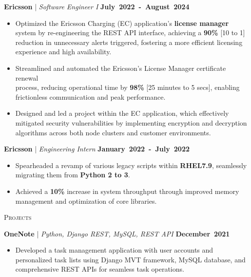 \documentclass[11pt, a4paper]{article}
\newcommand{\dates}[1]{\hfill\mbox{\textbf{#1}}} %
\newcommand{\headright}[1]{\vspace*{1.5ex}\textsc{\Large\color{heading}#1}\par%
     \vspace*{-1.5ex}{\color{accent}\hrulefill}\par}
\begin{document}
\begin{minipage}[t]{0.66\textwidth}
\large\textbf{{Ericsson}} \normalsize | \textit{Software Engineer I}  \dates{July 2022 - August 2024}
\begin{itemize}
\item Optimized the Ericsson Charging (EC) application's \textbf{license manager} system by re-engineering the REST API interface, achieving a \textbf{90\%} [10 to 1] reduction in unnecessary alerts triggered, fostering a more efficient licensing experience and high availability.
\item Streamlined and automated the Ericsson's License Manager certificate renewal \\ process, reducing operational time by \textbf{98\%} [25 minutes to 5 secs], enabling \\ frictionless communication and peak performance.
\item Designed and led a project within the EC application, which effectively mitigated security vulnerabilities by implementing encryption and decryption algorithms across both node clusters and customer environments.
\end{itemize}

\large\textbf{{Ericsson}} \normalsize | \textit{Engineering Intern}  \dates{January 2022 - July 2022}
\begin{itemize}
\item Spearheaded a revamp of various legacy scripts within \textbf{RHEL7.9}, seamlessly migrating them from \textbf{Python 2 to 3}.
\item Achieved a \textbf{10\%} increase in system throughput through improved memory \\ management and optimization of core libraries.
\end{itemize}

\headright{Projects}

\textbf{OneNote} \href{https://github.com/durgirajesh/OneNote}{\textbf{\faGithub}} | \textit{Python, Django REST, MySQL, REST API}  \dates{December 2021}
\begin{itemize}
\item Developed a task management application with user accounts and personalized task lists using Django MVT framework, MySQL database, and comprehensive REST APIs for seamless task operations.
\end{itemize}


\end{minipage}
\end{document}
